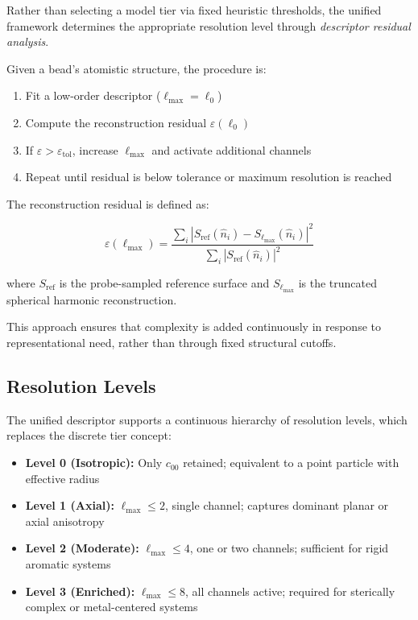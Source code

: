 \documentclass[11pt]{article}
\begin{document}
Rather than selecting a model tier via fixed heuristic thresholds, the unified framework determines the appropriate resolution level through \emph{descriptor residual analysis}.

Given a bead's atomistic structure, the procedure is:

\begin{enumerate}
    \item Fit a low-order descriptor ($\ell_{\max} = \ell_0$)
    \item Compute the reconstruction residual $\varepsilon(\ell_0)$
    \item If $\varepsilon > \varepsilon_{\text{tol}}$, increase $\ell_{\max}$ and activate additional channels
    \item Repeat until residual is below tolerance or maximum resolution is reached
\end{enumerate}

The reconstruction residual is defined as:

\begin{equation}
\varepsilon(\ell_{\max}) = \frac{\sum_{i} \left| S_{\text{ref}}(\hat{n}_i) - S_{\ell_{\max}}(\hat{n}_i) \right|^2}{\sum_{i} \left| S_{\text{ref}}(\hat{n}_i) \right|^2}
\end{equation}

where $S_{\text{ref}}$ is the probe-sampled reference surface and $S_{\ell_{\max}}$ is the truncated spherical harmonic reconstruction.

This approach ensures that complexity is added continuously in response to representational need, rather than through fixed structural cutoffs.

\subsection{Resolution Levels}

The unified descriptor supports a continuous hierarchy of resolution levels, which replaces the discrete tier concept:

\begin{itemize}
    \item \textbf{Level 0 (Isotropic):} Only $c_{00}$ retained; equivalent to a point particle with effective radius
    \item \textbf{Level 1 (Axial):} $\ell_{\max} \leq 2$, single channel; captures dominant planar or axial anisotropy
    \item \textbf{Level 2 (Moderate):} $\ell_{\max} \leq 4$, one or two channels; sufficient for rigid aromatic systems
    \item \textbf{Level 3 (Enriched):} $\ell_{\max} \leq 8$, all channels active; required for sterically complex or metal-centered systems
\end{itemize}
\end{document}
